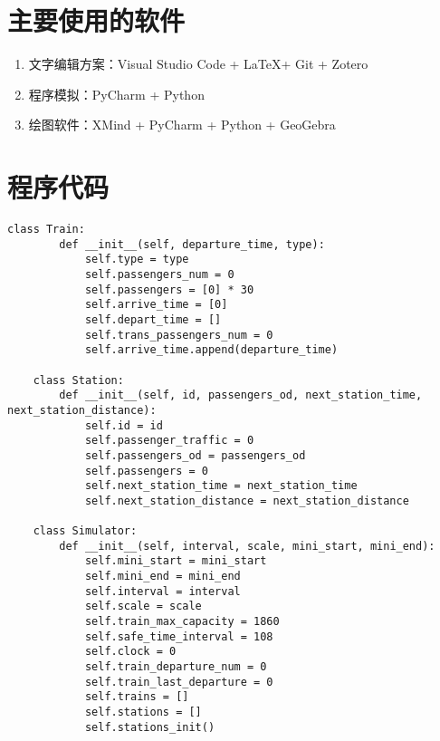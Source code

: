 

\nocite{*}      %





\appendix
\section{主要使用的软件}

\begin{enumerate}
    \item 文字编辑方案：Visual Studio Code + \LaTeX + Git + Zotero
    \item 程序模拟：PyCharm + Python
    \item 绘图软件：XMind + PyCharm + Python + GeoGebra
\end{enumerate}

\section{程序代码}

\begin{lstlisting}[caption={类的定义语句}]
    class Train:
        def __init__(self, departure_time, type):
            self.type = type
            self.passengers_num = 0
            self.passengers = [0] * 30
            self.arrive_time = [0]
            self.depart_time = []
            self.trans_passengers_num = 0
            self.arrive_time.append(departure_time)
    
    class Station:
        def __init__(self, id, passengers_od, next_station_time, next_station_distance):
            self.id = id
            self.passenger_traffic = 0
            self.passengers_od = passengers_od
            self.passengers = 0
            self.next_station_time = next_station_time
            self.next_station_distance = next_station_distance
    
    class Simulator:
        def __init__(self, interval, scale, mini_start, mini_end):
            self.mini_start = mini_start
            self.mini_end = mini_end
            self.interval = interval
            self.scale = scale
            self.train_max_capacity = 1860
            self.safe_time_interval = 108
            self.clock = 0
            self.train_departure_num = 0
            self.train_last_departure = 0
            self.trains = []
            self.stations = []
            self.stations_init()
    
    \end{lstlisting}